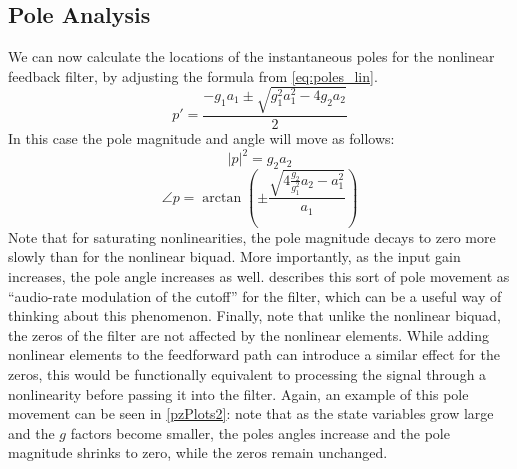 \documentclass[twoside,a4paper]{article}
\begin{document}
\subsection{Pole Analysis}
%
We can now calculate the locations of the instantaneous poles for
the nonlinear feedback filter, by adjusting the formula from
\cref{eq:poles_lin}.
%
\begin{equation}
p' = \frac{-g_1 a_1 \pm \sqrt{g_1^2 a_1^2 - 4 g_2 a_2}}{2}
    \label{eq:poles_nl2}
\end{equation}
%
In this case the pole magnitude and angle will move as follows:
\begin{equation}
    |p|^2 = g_2a_2
    \label{eq:poles_nl2_mag}
\end{equation}
%
\begin{equation}
    \angle p = \arctan \left( \pm \frac{\sqrt{4\frac{g_2}{g_1^2}a_2 - a_1^2}}{a_1} \right)
    \label{eq:poles_nl2_angle}
\end{equation}
%
Note that for saturating nonlinearities, the pole magnitude decays to
zero more slowly than for the
nonlinear biquad. More importantly, as the input gain increases,
the pole angle increases as well. \cite{Vadim} describes this sort of
pole movement as ``audio-rate modulation of the cutoff'' for the
filter, which can be a useful way of thinking about this phenomenon.
\newline\newline
Finally, note that unlike the nonlinear biquad, the zeros of the
filter are not affected by the nonlinear elements.
While adding nonlinear elements to the feedforward path can introduce 
a similar effect for the zeros, this would be
functionally equivalent to processing the signal through a nonlinearity
before passing it into the filter. Again, an example of this pole movement
can be seen in \cref{pzPlots2}: note that as the state variables grow
large and the $g$ factors become smaller, the poles angles increase and
the pole magnitude shrinks to zero, while the zeros remain unchanged.
%
\end{document}
